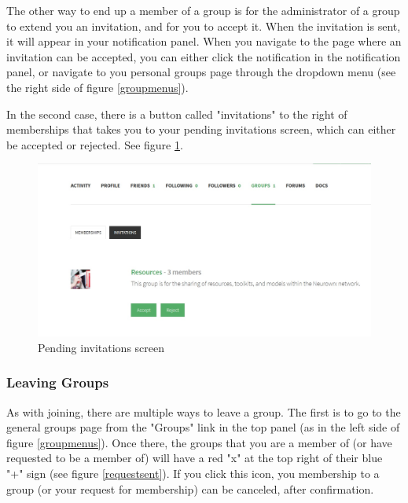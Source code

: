 \documentclass[10pt]{article}
\begin{document}
\begin{flushleft}
The other way to end up a member of a group is for the administrator of a group to extend you an invitation, and for you to accept it.  When the invitation is sent, it will appear in your notification panel.  When you navigate to the page where an invitation can be accepted, you can either click the notification in the notification panel, or navigate to you personal groups page through the dropdown menu (see the right side of figure \ref{groupmenus}). 
\end{flushleft}

\begin{flushleft}
 In the second case, there is a button called "invitations" to the right of memberships that takes you to your pending invitations screen, which can either be accepted or rejected.  See figure \ref{invites}. 
\end{flushleft}

\begin{figure}[h]
    \centering
    \includegraphics[scale=0.3]{images/invitations.jpg}
    \caption{Pending invitations screen}
    \label{invites}
\end{figure}

\subsubsection{Leaving Groups}

\begin{flushleft}
As with joining, there are multiple ways to leave a group.  The first is to go to the general groups page from the "Groups" link in the top panel (as in the left side of figure \ref{groupmenus}).  Once there, the groups that you are a member of (or have requested to be a member of) will have a red "x" at the top right of their blue "+" sign (see figure \ref{requestsent}).  If you click this icon, you membership to a group (or your request for membership) can be canceled, after confirmation. 
\end{flushleft}
\end{document}
